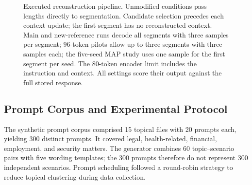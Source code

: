 \documentclass[electronics,article,submit,pdftex,moreauthors]{Definitions/mdpi}
\begin{document}
\begin{figure}[ht]
\centering
{}
\caption{Executed reconstruction pipeline. Unmodified conditions pass lengths directly to segmentation. Candidate selection precedes each context update; the first segment has no reconstructed context. Main and new-reference runs decode all segments with three samples per segment; 96-token pilots allow up to three segments with three samples each; the five-seed MAP study uses one sample for the first segment per seed. The 80-token encoder limit includes the instruction and context. All settings score their output against the full stored response.}
\label{fig:pipeline}
\end{figure}

\subsection{Prompt Corpus and Experimental Protocol}
The synthetic prompt corpus comprised 15 topical files with 20 prompts each, yielding 300 distinct prompts. It covered legal, health-related, financial, employment, and security matters. The generator combines 60 topic--scenario pairs with five wording templates; the 300 prompts therefore do not represent 300 independent scenarios. Prompt scheduling followed a round-robin strategy to reduce topical clustering during data collection.
\end{document}
